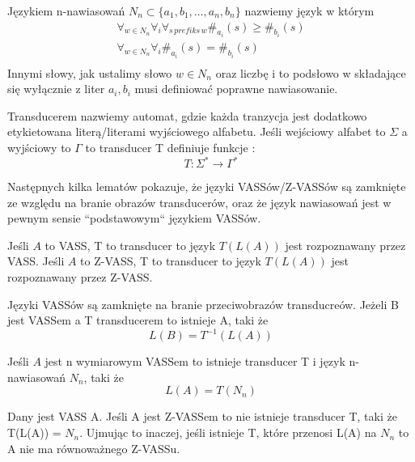     \begin{definition}
        Językiem n-nawiasowań $N_n \subset \{a_1,b_1, \dots , a_n, b_n\}$ nazwiemy język w którym
        \begin{gather*}
            \forall_{w \in N_n} \forall_i \forall_{s \, prefiks \,w} \#_{a_i}(s) \geq \#_{b_i}(s)\\
            \forall_{w \in N_n} \forall_i \#_{a_i}(s) = \#_{b_i}(s)\\
        \end{gather*}
        Innymi słowy, jak ustalimy słowo $w \in N_n$ oraz liczbę i to podsłowo w składające się wyłącznie z liter $a_i,b_i$ musi definiować poprawne nawiasowanie.
    \end{definition}


    \begin{definition}
        Transducerem nazwiemy automat,  gdzie każda tranzycja
        jest dodatkowo etykietowana literą/literami wyjściowego alfabetu.
        Jeśli wejściowy alfabet to $\Sigma$ a wyjściowy to $\Gamma$ to transducer T definiuje funkcje :
        \[T:\Sigma ^* \rightarrow \Gamma ^*\]
    \end{definition}

    Następnych kilka lematów\cite{toolbox} pokazuje, że języki VASSów/Z-VASSów są zamknięte ze względu na branie obrazów transducerów,
    oraz że język nawiasowań jest w pewnym sensie ``podstawowym`` językiem VASSów.

    \begin{lemma}
        \label{transducer_im}
        Jeśli $A$ to VASS, T to transducer to język $T(L(A))$ jest rozpoznawany przez VASS.
        Jeśli $A$ to Z-VASS, T to transducer to język $T(L(A))$ jest rozpoznawany przez Z-VASS.
    \end{lemma}

    \begin{lemma}
        \label{transducer_rev_im}
        Języki VASSów są zamknięte na branie przeciwobrazów transducreów.
        Jeżeli B jest VASSem a T transducerem to istnieje A, taki że
        \[L(B) = T^{-1}(L(A))\]
    \end{lemma}

    \begin{lemma}
        Jeśli $A$ jest n wymiarowym VASSem to istnieje transducer T i język n-nawiasowań $N_n$, taki że
        \[L(A) = T(N_n)\]
    \end{lemma}

    \begin{lemma}
        Dany jest VASS A.
        Jeśli A jest Z-VASSem to nie istnieje transducer T, taki że T(L(A)) = $N_n$.
        Ujmując to inaczej, jeśli istnieje T, które przenosi L(A) na $N_n$ to A nie ma równoważnego Z-VASSu.
    \end{lemma}

